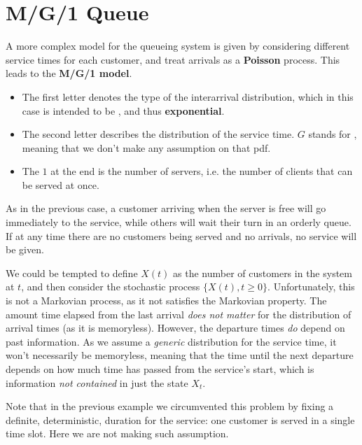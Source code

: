\documentclass[../template.tex]{subfiles}
\begin{document}

\section{M/G/1 Queue}
A more complex model for the queueing system is given by considering different service times for each customer, and treat arrivals as a \textbf{Poisson}  process. This leads to the \textbf{M/G/1 model}.

\begin{itemize}
    \item The first letter denotes the type of the interarrival distribution, which in this case is intended to be , and thus \textbf{exponential}. 
    \item The second letter describes the distribution of the service time. $G$ stands for , meaning that we don't make any assumption on that pdf.
    \item The $1$ at the end is the number of servers, i.e. the number of clients that can be served at once.
\end{itemize}

As in the previous case, a customer arriving when the server is free will go immediately to the service, while others will wait their turn in an orderly queue. If at any time there are no customers being served and no arrivals, no service will be given.

\medskip

We could be tempted to define $X(t)$ as the number of customers in the system at $t$, and then consider the stochastic process $\{X(t), t \geq 0\}$. Unfortunately, this is not a Markovian process, as it not satisfies the Markovian property. The amount time elapsed from the last arrival \textit{does not matter} for the distribution of arrival times (as it is memoryless). However, the departure times \textit{do} depend on past information. As we assume a \textit{generic} distribution for the service time, it won't necessarily be memoryless, meaning that the time until the next departure depends on how much time has passed from the service's start, which is information \textit{not contained} in just the state $X_t$. 

\begin{appr}
    Note that in the previous example we circumvented this problem by fixing a definite, deterministic, duration for the service: one customer is served in a single time slot. Here we are not making such assumption.
\end{appr}
\end{document}
